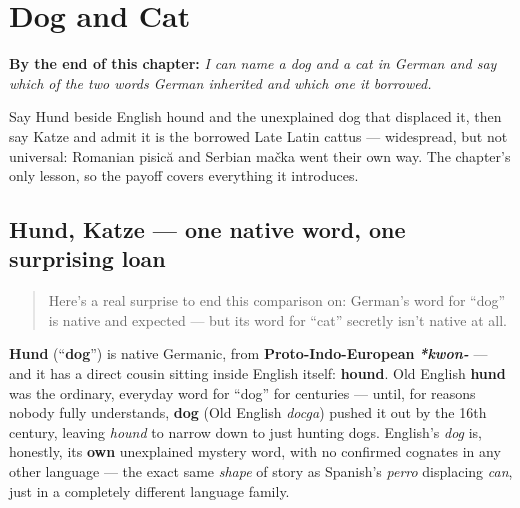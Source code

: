 
\chapter{Dog and Cat}
\label{ch:ge-dog-and-cat}

\begin{chapteropening}
\textbf{By the end of this chapter:} \emph{I can name a dog and a cat in German and say which of the two words German inherited and which one it borrowed.}

Say Hund beside English hound and the unexplained dog that displaced it, then say Katze and admit it is the borrowed Late Latin cattus — widespread, but not universal: Romanian pisică and Serbian mačka went their own way. The chapter's only lesson, so the payoff covers everything it introduces.
\end{chapteropening}

\section[Hund, Katze]{Hund, Katze — one native word, one surprising loan}

\label{lesson:GE-C22-hund-katze}



\begin{quote}
Here's a real surprise to end this comparison on: German's word for \textquotedblleft{}dog\textquotedblright{} is native and expected — but its word for \textquotedblleft{}cat\textquotedblright{} secretly isn't native at all.
\end{quote}

\begin{cousinweb}
\textbf{Hund} (\textquotedblleft{}\textbf{dog}\textquotedblright{}) is native Germanic, from \textbf{Proto-Indo-European} \emph{\textbf{*kwon-}} — and it has a direct cousin sitting inside English itself: \textbf{hound}. Old English \textbf{hund} was the ordinary, everyday word for \textquotedblleft{}dog\textquotedblright{} for centuries — until, for reasons nobody fully understands, \textbf{dog} (Old English \emph{docga}) pushed it out by the 16th century, leaving \emph{hound} to narrow down to just hunting dogs. English's \emph{dog} is, honestly, its \textbf{own} unexplained mystery word, with no confirmed cognates in any other language — the exact same \emph{shape} of story as Spanish's \emph{perro} displacing \emph{can}, just in a completely different language family.
\end{cousinweb}

